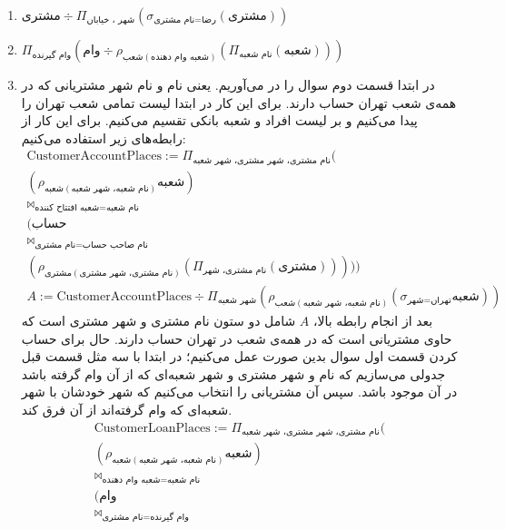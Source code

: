 \begin{enumerate}
    \item $\text{مشتری} \div \Pi_{\text{شهر ، خیابان}}(\sigma_{\text{نام مشتری} = \text{رضا}}(\text{مشتری}))$
    \item $\Pi_{\text{وام گیرنده}}(\text{وام} \div \rho_{\text{شعب}(\text{شعبه وام دهنده})} (\Pi_{\text{نام شعبه}}(\text{شعبه})))$
    \item در ابتدا قسمت دوم سوال را در می‌آوریم. یعنی نام و نام شهر مشتریانی که در همه‌ی شعب تهران حساب دارند.
    برای این کار در ابتدا لیست تمامی شعب تهران را پیدا می‌کنیم و بر لیست افراد و شعبه بانکی تقسیم می‌کنیم.
    برای این کار از رابطه‌های زیر استفاده می‌کنیم:
    \begin{gather*}
        \text{CustomerAccountPlaces} := \Pi_{\text{نام مشتری، شهر مشتری، شهر شعبه}}(
        \\
        (\rho_{\text{شعبه}(\text{نام شعبه، شهر شعبه})}\text{شعبه})
        \\
        \bowtie_{\text{شعبه افتتاح کننده}=\text{نام شعبه}}
        \\
        (\text{حساب}
        \\
        \bowtie_{\text{نام مشتری}=\text{نام صاحب حساب}}
        \\(\rho_{\text{مشتری}(\text{نام مشتری، شهر مشتری})}(\Pi_{\text{نام مشتری، شهر}}(\text{مشتری})))))
        \\
        A := \text{CustomerAccountPlaces} \div \Pi_{\text{شهر شعبه}}(\rho_{\text{شعب}(\text{نام شعبه، شهر شعبه})}(\sigma_{\text{شهر}=\text{تهران}}\text{شعبه}))
    \end{gather*}
    بعد از انجام رابطه بالا،
    $A$
    شامل دو ستون نام مشتری و شهر مشتری است که حاوی مشتریانی است که در همه‌ی شعب در تهران حساب دارند.
    حال برای حساب کردن قسمت اول سوال بدین صورت عمل می‌کنیم؛ در ابتدا با سه
    مثل قسمت قبل جدولی می‌سازیم که نام و شهر مشتری و شهر شعبه‌ای که از آن وام گرفته باشد در آن موجود باشد.
    سپس آن مشتریانی را انتخاب می‌کنیم که شهر خودشان با شهر شعبه‌ای که وام گرفته‌اند از آن فرق کند.
    \begin{gather*}
        \text{CustomerLoanPlaces} := \Pi_{\text{نام مشتری، شهر مشتری، شهر شعبه}}(
        \\
        (\rho_{\text{شعبه}(\text{نام شعبه، شهر شعبه})}\text{شعبه})
        \\
        \bowtie_{\text{شعبه وام دهنده}=\text{نام شعبه}}
        \\
        (\text{وام}
        \\
        \bowtie_{\text{نام مشتری}=\text{وام گیرنده}}

\end{gather*}
\end{enumerate}
